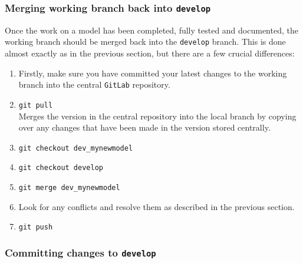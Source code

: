 \documentclass[11pt,a4paper]{report}
\begin{document}
\subsubsection{Merging working branch back into \texttt{develop}}

Once the work on a model has been completed, fully tested and documented, the
working branch should be merged back into the \texttt{develop} branch. This is
done almost exactly as in the previous section, but there are a few crucial
differences:

\begin{enumerate}

\item Firstly, make sure you have committed your latest changes to the working
  branch into the central \texttt{GitLab} repository.

\item \texttt{git pull}\\
Merges the version in the central repository into the local branch by copying over any changes that have been made in the version stored centrally.

\item \texttt{git checkout dev\_mynewmodel}

\item \texttt{git checkout develop}

\item \texttt{git merge dev\_mynewmodel}

\item Look for any conflicts and resolve them as described in the previous
  section.

\item \texttt{git push}

\end{enumerate}

\subsubsection{Committing changes to \texttt{develop}}
\end{document}
